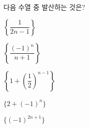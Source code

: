 다음 수열 중 발산하는 것은?
\begin{choices32}{\rule[-3ex]{0pt}{8ex}$\left\{\dfrac{1}{2n-1}\right\}$}{\rule[-3ex]{0pt}{8ex}$\left\{\dfrac{(-1)^n}{n+1}\right\}$}{\rule[-3ex]{0pt}{8ex}$\left\{1+\left(\dfrac{1}{2}\right)^{n-1}\right\}$}{\rule[-3ex]{0pt}{8ex}$\{2+(-1)^n\}$}{\rule[-3ex]{0pt}{8ex}$\{(-1)^{2n+1}\}$}\end{choices32}
